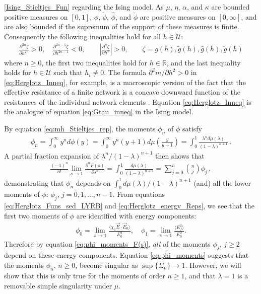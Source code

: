 \documentclass[english,12pt,jmp,graphicx]{revtex4-1}
\newcommand{\ph}{\hat{\phi}}
\begin{document}
\eqref{Ising_Stieltjes_Fun} regarding the Ising model.  
As $\mu$, $\eta$, $\alpha$, and $\kappa$ are bounded positive measures on
$[0,1]$, $\phi$, $\tilde{\phi}$, $\ph$, and $\check{\phi}$ are positive
measures on $[0,\infty]$, and are also bounded if the supremum of the
support of these measures is finite. Consequently the following
inequalities hold for all $h\in\mathcal{U}$: 
\begin{align}\label{eq:Herglotz_Inneq}
  \frac{\partial^{2n}\zeta}{\partial h^{2n}}>0, \quad
  \frac{\partial^{2n-1}\zeta}{\partial h^{2n-1}}<0, \qquad
  \left|\frac{\partial^n\zeta}{\partial h^n}\right|>0, \qquad
  \zeta=g(h),\tilde{g}(h),\hat{g}(h),\check{g}(h)
\end{align}
%
where $n\geq0$, the first two inequalities hold for $h\in\mathbb{R}$, and
the last inequality holds for $h\in\mathcal{U}$ such that $h_i\neq0$. The
formula $\partial^2m/\partial h^2>0$ in \eqref{eq:Herglotz_Inneq}, for
example, is a macroscopic version of
the fact that the effective resistance of a finite network is a
concave downward function of the resistances of the individual network
elements \cite{Golden:JMP-5627}. Equation \eqref{eq:Herglotz_Inneq} is
the analogue of equation \eqref{eq:Gtau_inneq} in the Ising model.

By equation \eqref{eq:mh_Stieltjes_rep}, the moments $\phi_n$ of $\phi$
satisfy  
%
\begin{align}\label{eq:phi_moments}
  \phi_n=\int_0^\infty y^nd\phi(y)
    =\int_0^\infty y^n(y+1)d\mu\left(\frac{y}{y+1}\right)
    =\int_0^1\frac{\lambda^nd\mu(\lambda)}{(1-\lambda)^{n+1}}\,.
\end{align}
%
A partial fraction expansion of $\lambda^n/(1-\lambda)^{n+1}$ then shows that
%
\begin{align}\label{eq:phi_moments_F(s)}
  \frac{(-1)^n}{n!}\lim_{s\to1}\frac{\partial^nF(s)}{\partial s^n}=\int_0^1\frac{d\mu(\lambda)}{(1-\lambda)^{n+1}}
                                =\sum_{j=0}^n{n \choose j} \phi_j\,,
\end{align}
%
demonstrating that $\phi_n$ depends on $\int_0^1d\mu(\lambda)/(1-\lambda)^{n+1}$
(and) all the lower moments of $\phi$: $\phi_j$, $j=0,1,\ldots,n-1$.
From equations \eqref{eq:Herglotz_Funs_sed_LYRB} and
\eqref{eq:Herglotz_energy_Reps}, we see that the first two moments of
$\phi$ are identified with energy components:    
%
\begin{align}\label{eq:phi_energy_relations}
  \phi_0=\lim_{s\to1}\frac{\langle\chi_1\vec{E}\cdot\vec{E}_0\rangle}{E_0^2},   \quad
  \phi_1=\lim_{s\to1}\frac{\langle E_f^2\rangle}{E_0^2}.
\end{align}
%
Therefore by equation \eqref{eq:phi_moments_F(s)}, \emph{all} of the
moments $\phi_j$, $j\geq2$ depend on these energy components. Equation
\eqref{eq:phi_moments} suggests that the moments $\phi_n$, $n\geq0$, become
singular as $\sup\{\Sigma_\mu\}\to1$. However, we will show that this is only
true for the moments of order $n\geq1$, and that $\lambda=1$ is a removable
simple singularity under $\mu$. 
\end{document}
